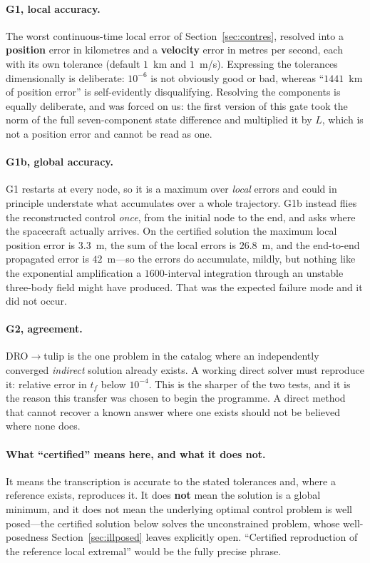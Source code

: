 \documentclass[11pt]{article}
\begin{document}
\paragraph{G1, local accuracy.} The worst continuous-time local error of
Section~\ref{sec:contres}, resolved into a \textbf{position} error in kilometres
and a \textbf{velocity} error in metres per second, each with its own tolerance
(default $1$~km and $1$~m/s). Expressing the tolerances dimensionally is
deliberate: $10^{-6}$ is not obviously good or bad, whereas ``$1441$~km of
position error'' is self-evidently disqualifying. Resolving the components is
equally deliberate, and was forced on us: the first version of this gate took the
norm of the full seven-component state difference and multiplied it by $L$, which
is not a position error and cannot be read as one.

\paragraph{G1b, global accuracy.} G1 restarts at every node, so it is a maximum
over \emph{local} errors and could in principle understate what accumulates over
a whole trajectory. G1b instead flies the reconstructed control \emph{once},
from the initial node to the end, and asks where the spacecraft actually
arrives. On the certified solution the maximum local position error is $3.3$~m,
the sum of the local errors is $26.8$~m, and the end-to-end propagated error is
$42$~m---so the errors do accumulate, mildly, but nothing like the exponential
amplification a $1600$-interval integration through an unstable three-body field
might have produced. That was the expected failure mode and it did not occur.

\paragraph{G2, agreement.} DRO$\to$tulip is the one problem in the catalog where
an independently converged \emph{indirect} solution already exists. A working
direct solver must reproduce it: relative error in $t_f$ below $10^{-4}$. This
is the sharper of the two tests, and it is the reason this transfer was chosen
to begin the programme. A direct method that cannot recover a known answer where
one exists should not be believed where none does.

\paragraph{What ``certified'' means here, and what it does not.} It means the
transcription is accurate to the stated tolerances and, where a reference exists,
reproduces it. It does \textbf{not} mean the solution is a global minimum, and it
does not mean the underlying optimal control problem is well posed---the
certified solution below solves the unconstrained problem, whose well-posedness
Section~\ref{sec:illposed} leaves explicitly open. ``Certified reproduction of
the reference local extremal'' would be the fully precise phrase.
\end{document}
